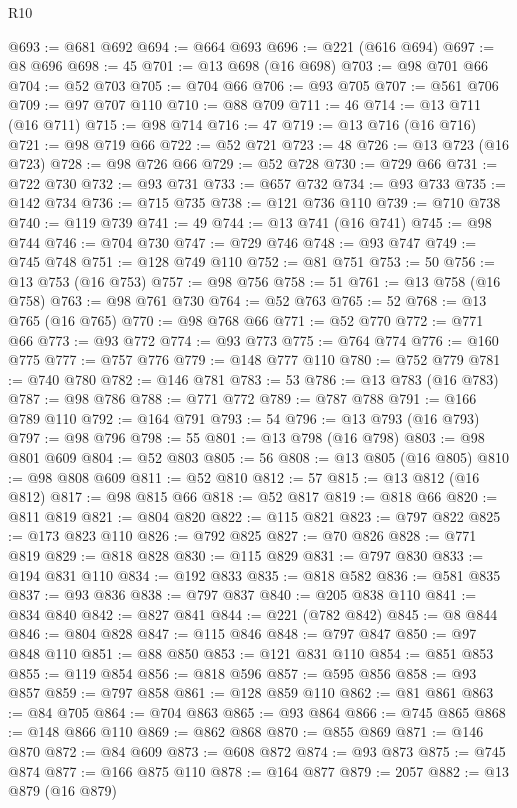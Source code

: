 \begin{lexlean}{R10}
\begin{coremodule}
@693 := @681 @692
@694 := @664 @693
@696 := @221 (@616 @694)
@697 := @8 @696
@698 := 45
@701 := @13 @698 (@16 @698)
@703 := @98 @701 @66
@704 := @52 @703
@705 := @704 @66
@706 := @93 @705
@707 := @561 @706
@709 := @97 @707 @110
@710 := @88 @709
@711 := 46
@714 := @13 @711 (@16 @711)
@715 := @98 @714
@716 := 47
@719 := @13 @716 (@16 @716)
@721 := @98 @719 @66
@722 := @52 @721
@723 := 48
@726 := @13 @723 (@16 @723)
@728 := @98 @726 @66
@729 := @52 @728
@730 := @729 @66
@731 := @722 @730
@732 := @93 @731
@733 := @657 @732
@734 := @93 @733
@735 := @142 @734
@736 := @715 @735
@738 := @121 @736 @110
@739 := @710 @738
@740 := @119 @739
@741 := 49
@744 := @13 @741 (@16 @741)
@745 := @98 @744
@746 := @704 @730
@747 := @729 @746
@748 := @93 @747
@749 := @745 @748
@751 := @128 @749 @110
@752 := @81 @751
@753 := 50
@756 := @13 @753 (@16 @753)
@757 := @98 @756
@758 := 51
@761 := @13 @758 (@16 @758)
@763 := @98 @761 @730
@764 := @52 @763
@765 := 52
@768 := @13 @765 (@16 @765)
@770 := @98 @768 @66
@771 := @52 @770
@772 := @771 @66
@773 := @93 @772
@774 := @93 @773
@775 := @764 @774
@776 := @160 @775
@777 := @757 @776
@779 := @148 @777 @110
@780 := @752 @779
@781 := @740 @780
@782 := @146 @781
@783 := 53
@786 := @13 @783 (@16 @783)
@787 := @98 @786
@788 := @771 @772
@789 := @787 @788
@791 := @166 @789 @110
@792 := @164 @791
@793 := 54
@796 := @13 @793 (@16 @793)
@797 := @98 @796
@798 := 55
@801 := @13 @798 (@16 @798)
@803 := @98 @801 @609
@804 := @52 @803
@805 := 56
@808 := @13 @805 (@16 @805)
@810 := @98 @808 @609
@811 := @52 @810
@812 := 57
@815 := @13 @812 (@16 @812)
@817 := @98 @815 @66
@818 := @52 @817
@819 := @818 @66
@820 := @811 @819
@821 := @804 @820
@822 := @115 @821
@823 := @797 @822
@825 := @173 @823 @110
@826 := @792 @825
@827 := @70 @826
@828 := @771 @819
@829 := @818 @828
@830 := @115 @829
@831 := @797 @830
@833 := @194 @831 @110
@834 := @192 @833
@835 := @818 @582
@836 := @581 @835
@837 := @93 @836
@838 := @797 @837
@840 := @205 @838 @110
@841 := @834 @840
@842 := @827 @841
@844 := @221 (@782 @842)
@845 := @8 @844
@846 := @804 @828
@847 := @115 @846
@848 := @797 @847
@850 := @97 @848 @110
@851 := @88 @850
@853 := @121 @831 @110
@854 := @851 @853
@855 := @119 @854
@856 := @818 @596
@857 := @595 @856
@858 := @93 @857
@859 := @797 @858
@861 := @128 @859 @110
@862 := @81 @861
@863 := @84 @705
@864 := @704 @863
@865 := @93 @864
@866 := @745 @865
@868 := @148 @866 @110
@869 := @862 @868
@870 := @855 @869
@871 := @146 @870
@872 := @84 @609
@873 := @608 @872
@874 := @93 @873
@875 := @745 @874
@877 := @166 @875 @110
@878 := @164 @877
@879 := 2057
@882 := @13 @879 (@16 @879)

\end{coremodule}
\end{lexlean}
